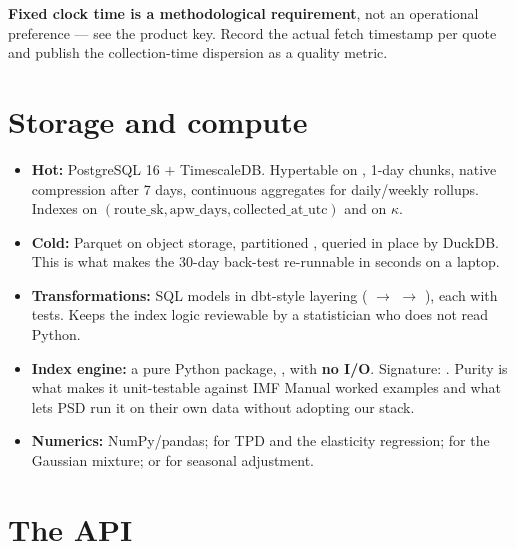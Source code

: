 \noindent \textbf{Fixed clock time is a methodological requirement}, not an operational
preference --- see the product key. Record the actual fetch timestamp per quote and publish
the collection-time dispersion as a quality metric.

\section{Storage and compute}

\begin{itemize}
\item \textbf{Hot:} PostgreSQL 16 $+$ TimescaleDB. Hypertable on ,
1-day chunks, native compression after 7 days, continuous aggregates for daily/weekly
rollups. Indexes on $(\text{route\_sk}, \text{apw\_days}, \text{collected\_at\_utc})$ and on
$\kappa$.
\item \textbf{Cold:} Parquet on object storage, partitioned
, queried in place by DuckDB. This is what makes the 30-day
back-test re-runnable in seconds on a laptop.
\item \textbf{Transformations:} SQL models in dbt-style layering
( $\to$  $\to$ ), each with tests. Keeps the
index logic reviewable by a statistician who does not read Python.
\item \textbf{Index engine:} a pure Python package, , with \textbf{no I/O}.
Signature: . Purity is what makes it unit-testable against IMF Manual worked examples and
what lets PSD run it on their own data without adopting our stack.
\item \textbf{Numerics:} NumPy/pandas;  for TPD and the elasticity
regression;  for the Gaussian mixture;  or
 for seasonal adjustment.
\end{itemize}

\section{The API}

